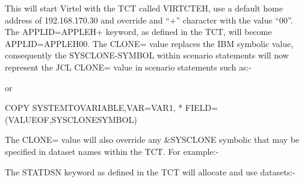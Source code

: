 \documentclass[letterpaper,10pt,english]{sphinxmanual}
\begin{document}
\begin{sphinxVerbatim}[commandchars=\\\{\}]
  
\end{sphinxVerbatim}

This will start Virtel with the TCT called VIRTCTEH, use a default home address of 192.168.170.30 and override and “+” character with the value “00”. The APPLID=APPLEH+ keyword, as defined in the TCT, will become APPLID=APPLEH00. The CLONE= value replaces the IBM symbolic value, consequently the SYSCLONE-SYMBOL within scenario statements will now represent the JCL CLONE= value in scenario statements such as:-

\begin{sphinxVerbatim}[commandchars=\\\{\}]
 
\end{sphinxVerbatim}

or

\begin{sphinxVerbatim}[commandchars=\\\{\}]
COPY\PYGZdl{} SYSTEM\PYGZhy{}TO\PYGZhy{}VARIABLE,VAR=\PYGZsq{}VAR1\PYGZsq{},                    *
  FIELD=(VALUE\PYGZhy{}OF,SYSCLONE\PYGZhy{}SYMBOL)
\end{sphinxVerbatim}

The CLONE= value will also override any \&SYSCLONE symbolic that may be specified in dataset names within the TCT. For example:-

\begin{sphinxVerbatim}[commandchars=\\\{\}]
                  
                          
\end{sphinxVerbatim}

The STATDSN keyword as defined in the TCT will allocate and use datasets:-
\end{document}
